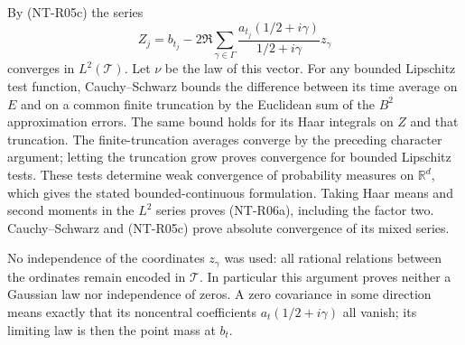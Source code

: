 By (NT-R05c) the series
\[
 Z_j=b_{t_j}-2\Re\sum_{\gamma\in\Gamma}
       \frac{a_{t_j}(1/2+i\gamma)}{1/2+i\gamma}z_\gamma
\]
converges in $L^2(\mathcal T)$. Let $\nu$ be the law of this vector.
For any bounded Lipschitz test function, Cauchy--Schwarz bounds the
difference between its time average on $E$ and on a common finite
truncation by the Euclidean sum of the $B^2$ approximation errors.
The same bound holds for its Haar integrals on $Z$ and that
truncation. The finite-truncation averages converge by the preceding
character argument; letting the truncation grow proves convergence
for bounded Lipschitz tests. These tests determine weak convergence
of probability measures on $\mathbb R^d$, which gives the stated
bounded-continuous formulation. Taking Haar means and second moments
in the $L^2$ series proves (NT-R06a), including the factor two.
Cauchy--Schwarz and (NT-R05c) prove absolute convergence of its
mixed series.

No independence of the coordinates $z_\gamma$ was used: all rational
relations between the ordinates remain encoded in $\mathcal T$.
In particular this argument proves neither a Gaussian law nor
independence of zeros. A zero covariance in some direction means
exactly that its noncentral coefficients $a_t(1/2+i\gamma)$ all
vanish; its limiting law is then the point mass at $b_t$.

